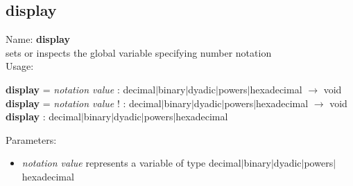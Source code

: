 \subsection{display}
\label{labdisplay}
\noindent Name: \textbf{display}\\
sets or inspects the global variable specifying number notation\\
\noindent Usage: 
\begin{center}
\textbf{display} = \emph{notation value} : \textsf{decimal$|$binary$|$dyadic$|$powers$|$hexadecimal} $\rightarrow$ \textsf{void}\\
\textbf{display} = \emph{notation value} ! : \textsf{decimal$|$binary$|$dyadic$|$powers$|$hexadecimal} $\rightarrow$ \textsf{void}\\
\textbf{display} : \textsf{decimal$|$binary$|$dyadic$|$powers$|$hexadecimal}\\
\end{center}
Parameters: 
\begin{itemize}
\item \emph{notation value} represents a variable of type \textsf{decimal$|$binary$|$dyadic$|$powers$|$hexadecimal}
\end{itemize}
